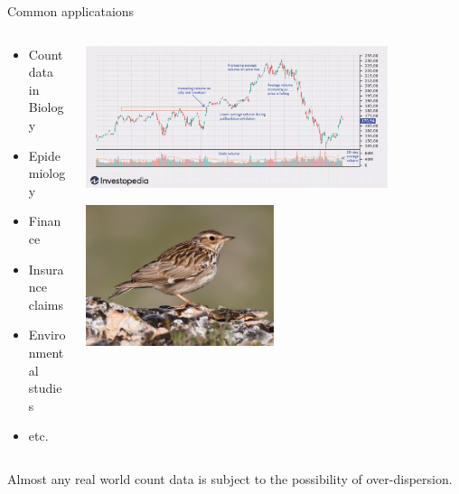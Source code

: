 \documentclass[
  ignorenonframetext,
]{beamer}
\providecommand{\tightlist}{%
  \setlength{\itemsep}{0pt}\setlength{\parskip}{0pt}}\usepackage{longtable,booktabs,array}
\begin{document}
\begin{frame}{Common applicataions}
\label{common-applicataions}
\begin{columns}[T]
\begin{column}{0.5\textwidth}
\begin{itemize}
\tightlist
\item
  Count data in Biology
\item
  Epidemiology
\item
  Finance
\item
  Insurance claims
\item
  Environmental studies
\item
  etc.
\end{itemize}
\end{column}

\begin{column}{0.5\textwidth}
\begin{center}
\includegraphics[width=0.8\textwidth,height=\textheight]{daily_stock_trades.png}
\end{center}

\begin{center}
\includegraphics[width=0.5\textwidth,height=\textheight]{woodlark.png}
\end{center}
\end{column}
\end{columns}

Almost any real world count data is subject to the possibility of
over-dispersion.
\end{frame}
\end{document}
